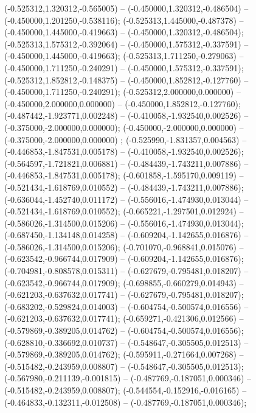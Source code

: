  (-0.525312,1.320312,-0.565005) -- (-0.450000,1.320312,-0.486504) -- (-0.450000,1.201250,-0.538116);
 (-0.525313,1.445000,-0.487378) -- (-0.450000,1.445000,-0.419663) -- (-0.450000,1.320312,-0.486504);
 (-0.525313,1.575312,-0.392064) -- (-0.450000,1.575312,-0.337591) -- (-0.450000,1.445000,-0.419663);
 (-0.525313,1.711250,-0.279063) -- (-0.450000,1.711250,-0.240291) -- (-0.450000,1.575312,-0.337591);
 (-0.525312,1.852812,-0.148375) -- (-0.450000,1.852812,-0.127760) -- (-0.450000,1.711250,-0.240291);
 (-0.525312,2.000000,0.000000) -- (-0.450000,2.000000,0.000000) -- (-0.450000,1.852812,-0.127760);
 (-0.487442,-1.923771,0.002248) -- (-0.410058,-1.932540,0.002526) -- (-0.375000,-2.000000,0.000000);
 (-0.450000,-2.000000,0.000000) -- (-0.375000,-2.000000,0.000000) ;
 (-0.525990,-1.831357,0.004563) -- (-0.446853,-1.847531,0.005178) -- (-0.410058,-1.932540,0.002526);
 (-0.564597,-1.721821,0.006881) -- (-0.484439,-1.743211,0.007886) -- (-0.446853,-1.847531,0.005178);
 (-0.601858,-1.595170,0.009119) -- (-0.521434,-1.618769,0.010552) -- (-0.484439,-1.743211,0.007886);
 (-0.636044,-1.452740,0.011172) -- (-0.556016,-1.474930,0.013044) -- (-0.521434,-1.618769,0.010552);
 (-0.665221,-1.297501,0.012924) -- (-0.586026,-1.314500,0.015206) -- (-0.556016,-1.474930,0.013044);
 (-0.687450,-1.134148,0.014258) -- (-0.609204,-1.142655,0.016876) -- (-0.586026,-1.314500,0.015206);
 (-0.701070,-0.968841,0.015076) -- (-0.623542,-0.966744,0.017909) -- (-0.609204,-1.142655,0.016876);
 (-0.704981,-0.808578,0.015311) -- (-0.627679,-0.795481,0.018207) -- (-0.623542,-0.966744,0.017909);
 (-0.698855,-0.660279,0.014943) -- (-0.621203,-0.637632,0.017741) -- (-0.627679,-0.795481,0.018207);
 (-0.683202,-0.529824,0.014003) -- (-0.604754,-0.500574,0.016556) -- (-0.621203,-0.637632,0.017741);
 (-0.659271,-0.421306,0.012566) -- (-0.579869,-0.389205,0.014762) -- (-0.604754,-0.500574,0.016556);
 (-0.628810,-0.336692,0.010737) -- (-0.548647,-0.305505,0.012513) -- (-0.579869,-0.389205,0.014762);
 (-0.595911,-0.271664,0.007268) -- (-0.515482,-0.243959,0.008807) -- (-0.548647,-0.305505,0.012513);
 (-0.567980,-0.211139,-0.001815) -- (-0.487769,-0.187051,0.000346) -- (-0.515482,-0.243959,0.008807);
 (-0.544554,-0.152916,-0.016165) -- (-0.464833,-0.132311,-0.012508) -- (-0.487769,-0.187051,0.000346);
